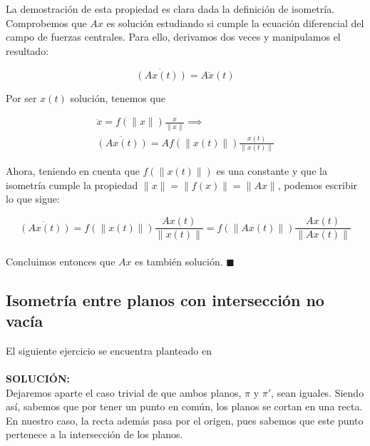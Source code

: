 \documentclass[10pt,a4paper]{article}
\theoremstyle{mystyle}
\begin{document}
La demostración de esta propiedad es clara dada la definición de isometría.\\

Comprobemos que $Ax$ es solución estudiando si cumple la ecuación diferencial del campo de fuerzas centrales. Para ello, derivamos dos veces y manipulamos el resultado:

\[
\ddot{(Ax(t))} = A\ddot{x}(t)
\]

Por ser $x(t)$ solución, tenemos que

 \begin{align*}
 \ddot{x} = f(\lVert x \rVert)\frac{x}{\lVert x \rVert} \implies \\
 \ddot{(Ax(t))} = Af(\lVert x(t) \rVert)\frac{x(t)}{\lVert x(t) \rVert}
 \end{align*}
 
Ahora, teniendo en cuenta que $f(\lVert x(t) \rVert)$ es una constante y que la isometría cumple la propiedad $\lVert x \rVert = \lVert f(x) \rVert = \lVert Ax \rVert$, podemos escribir lo que sigue:

\[
\ddot{(Ax(t))} = f(\lVert x(t) \rVert)\frac{Ax(t)}{\lVert x(t) \rVert} = f(\lVert Ax(t) \rVert)\frac{Ax(t)}{\lVert Ax(t) \rVert}
\]\\

Concluimos entonces que $Ax$ es también solución. $\blacksquare$

\subsection{Isometría entre planos con intersección no vacía}

El siguiente ejercicio se encuentra planteado en \cite{celeste}\\

\hfill\\

\textbf{SOLUCIÓN:}\\

Dejaremos aparte el caso trivial de que ambos planos, $\pi$ y $\pi '$, sean iguales. Siendo así, sabemos que por tener un punto en común, los planos se cortan en una recta. En nuestro caso, la recta además pasa por el origen, pues sabemos que este punto pertenece a la intersección de los planos.\\
\end{document}
